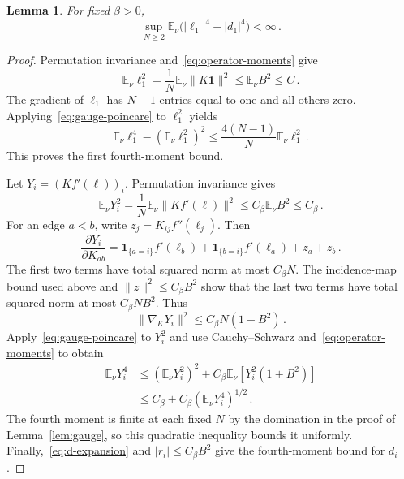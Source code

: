 \documentclass[11pt]{amsart}
\numberwithin{equation}{section}
\newtheorem{lemma}[theorem]{Lemma}
\theoremstyle{remark}
\newcommand{\E}{\mathbb E}
\newcommand{\one}{\mathbf 1}
\begin{document}
\begin{lemma}\label{lem:local-moments}
For fixed $\beta>0$,
\begin{equation}
 \sup_{N\ge2}\E_\nu\bigl(|\ell_1|^4+|d_1|^4\bigr)<\infty\,.
 \label{eq:local-fourth}
\end{equation}
\end{lemma}
\begin{proof}
Permutation invariance and~\eqref{eq:operator-moments} give
\begin{equation}
 \E_\nu\ell_1^2=\frac1N\E_\nu\|K\one\|^2\le\E_\nu B^2\le C\,.
 \label{eq:local-second}
\end{equation}
The gradient of $\ell_1$ has $N-1$ entries equal to one and all others zero. Applying~\eqref{eq:gauge-poincare} to $\ell_1^2$ yields
\begin{equation*}
 \E_\nu\ell_1^4-(\E_\nu\ell_1^2)^2
 \le\frac{4(N-1)}N\E_\nu\ell_1^2\,.
\end{equation*}
This proves the first fourth-moment bound.

Let $Y_i=(Kf'(\ell))_i$. Permutation invariance gives
\begin{equation*}
 \E_\nu Y_i^2=\frac1N\E_\nu\|Kf'(\ell)\|^2\le C_\beta\E_\nu B^2\le C_\beta\,.
\end{equation*}
For an edge $a<b$, write $z_j=K_{ij}f''(\ell_j)$. Then
\begin{equation*}
 \frac{\partial Y_i}{\partial K_{ab}}
 =\one_{\{a=i\}}f'(\ell_b)+\one_{\{b=i\}}f'(\ell_a)+z_a+z_b\,.
\end{equation*}
The first two terms have total squared norm at most $C_\beta N$. The incidence-map bound used above and $\|z\|^2\le C_\beta B^2$ show that the last two terms have total squared norm at most $C_\beta NB^2$. Thus
\begin{equation*}
 \|\nabla_KY_i\|^2\le C_\beta N(1+B^2)\,.
\end{equation*}
Apply~\eqref{eq:gauge-poincare} to $Y_i^2$ and use Cauchy--Schwarz and~\eqref{eq:operator-moments} to obtain
\begin{align*}
 \E_\nu Y_i^4
 &\le(\E_\nu Y_i^2)^2+C_\beta\E_\nu[Y_i^2(1+B^2)]\\
 &\le C_\beta+C_\beta(\E_\nu Y_i^4)^{1/2}\,.
\end{align*}
The fourth moment is finite at each fixed $N$ by the domination in the proof of Lemma~\ref{lem:gauge}, so this quadratic inequality bounds it uniformly. Finally,~\eqref{eq:d-expansion} and $|r_i|\le C_\beta B^2$ give the fourth-moment bound for $d_i$.
\end{proof}
\end{document}
